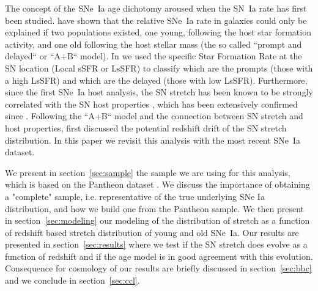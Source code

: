 \documentclass[]{aa} %
\begin{document}

The concept of the SNe~Ia age dichotomy aroused when the SN~Ia rate has first
been studied. \cite{mannucci2005, scannapieco2005, sullivan2006, aubourg2008}
have shown that the relative SNe~Ia rate in galaxies could only be explained if
two populations existed, one young, following the host star formation activity,
and one old following the host stellar mass (the so called “prompt and delayed“
or “A+B“ model). In \cite{rigault2018} we used the specific Star Formation Rate
at the SN location (Local sSFR or LsSFR) to classify which are the prompts
(those with a high LsSFR) and which are the delayed (those with low LsSFR).
Furthermore, since the first SNe~Ia host analysis, the SN stretch has been known
to be strongly correlated with the SN host properties \citep{hamuy1996,
hamuy2000}, which has been extensively confirmed since \citep[e.g.][]{neill2009,
sullivan2010, lampeitl2010, kelly2010, gupta2011, dandrea2011, childress2013,
rigault2013, pan2014, kim19}. Following the “A+B“ model and the connection between SN
stretch and host properties, \cite{howell2007} first discussed the potential
redshift drift of the SN stretch distribution. In this paper we revisit this
analysis with the most recent SNe~Ia dataset.

We present in section~\ref{sec:sample} the sample we are using for this
analysis, which is based on the Pantheon dataset \citep{scolnic2018a}. We
discuss the importance of obtaining a "complete" sample, i.e. representative of
the true underlying SNe Ia distribution, and how we build one from the Pantheon
sample.  We then present in section~\ref{sec:modeling} our modeling of the
distribution of stretch as a function of redshift based stretch distribution of
young and old SNe~Ia. Our results are presented in section~\ref{sec:results}
where we test if the SN stretch does evolve as a function of redshift and if the
age model is in good agreement with this evolution. Consequence for cosmology of
our results are briefly discussed in section~\ref{sec:bbc} and we conclude in
section~\ref{sec:ccl}.
\end{document}
